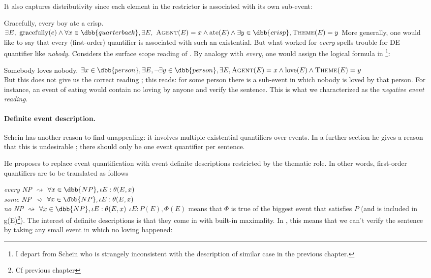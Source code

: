 It also captures distributivity since each element in the restrictor is associated with its own sub-event:

\pex
\a
Gracefully, every boy ate a crisp.
\a
$\exists E,\ \text{gracefully}(e) \wedge \forall x\in\dbb{quarterback}, \exists E,\ \textsc{Agent}(E) = x \wedge \text{ate}(E) \wedge \exists y\in\dbb{crisp}, \textsc{Theme}(E) = y$ 
\xe
%
More generally, one would like to say that every (first-order) quantifier is associated with such an existential. But what worked for \emph{every} spells trouble for DE quantifier like \emph{nobody}. Considers the surface scope reading of \cnextxa. By analogy with \emph{every}, one would assign \cnextxa the logical formula in \cnextxb\footnote{
I depart from Schein who is strangely inconsistent with the description of similar case in the previous chapter.
}:

\pex
\a \label{sono}
Somebody loves nobody.
\a 
$\exists x\in\dbb{person},\exists E, \neg\exists y\in \dbb{person}, \exists E,  \textsc{Agent}(E) = x \wedge \text{love}(E) \wedge \textsc{Theme}(E) = y$\\
\xe
%
But this does not give us the correct reading ; this reads: for some person there is a sub-event in which nobody is loved by that person. For instance, an event of eating would contain no loving by anyone and verify the sentence. This is what we characterized as the \emph{negative event reading}.

\paragraph{Definite event description.}
Schein has another reason to find \clastxa unappealing: it involves multiple existential quantifiers over events. In a further section he gives a reason that this is undesirable ; there should only be one event quantifier per sentence. 

He proposes to replace event quantification with event definite descriptions restricted by the thematic role. In other words, first-order quantifiers are to be translated as follows

\pex
\a
\emph{every NP} $\rightsquigarrow$ $\forall x\in \dbb{NP}, \iota E : \theta(E, x)$\\
\emph{some NP} $\rightsquigarrow$ $\forall x\in \dbb{NP}, \iota E : \theta(E, x)$\\
\emph{no NP} $\rightsquigarrow$ $\forall x\in \dbb{NP}, \iota E : \theta(E, x)$
\a 
$\iota E : P(E), \Phi(E)$ means that $\Phi$ is true of the biggest event that satisfies $P$ (and is included in g(E)\footnote{Cf previous chapter}).
\xe
%
The interest of definite descriptions is that they come in with built-in maximality. In \cnextx, this means that we can't verify the sentence by taking any small event in which no loving happened:

